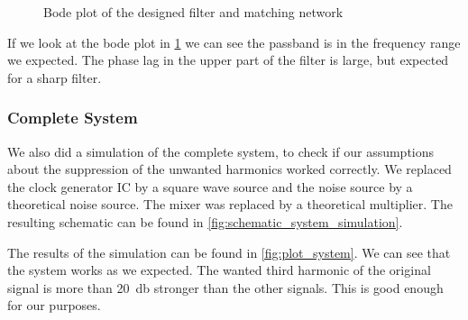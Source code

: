\documentclass[a4paper, openany, oneside]{memoir}
\begin{document}
\begin{figure}[H]
\centering
{}
\caption{Bode plot of the designed filter and matching network}
\label{fig:plot_bode_filter}
\end{figure}

If we look at the bode plot in \cref{fig:plot_bode_filter} we can see the passband is in the frequency range we expected. The phase lag in the upper part of the filter is large, but expected for a sharp filter.

\subsubsection{Complete System}
We also did a simulation of the complete system, to check if our assumptions about the suppression of the unwanted harmonics worked correctly. We replaced the clock generator IC by a square wave source and the noise source by a theoretical noise source. The mixer was replaced by a theoretical multiplier. The resulting schematic can be found in \cref{fig:schematic_system_simulation}.

The results of the simulation can be found in \cref{fig:plot_system}. We can see that the system works as we expected. The wanted third harmonic of the original signal is more than \SI{20}{\decibel} stronger than the other signals. This is good enough for our purposes.
\end{document}
